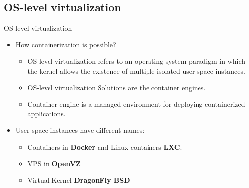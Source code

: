 \subsection{OS-level virtualization}\label{subsec:os-level-virtualization}
\begin{frame}{OS-level virtualization}
    \begin{itemize}
        \item How containerization is possible?
        \begin{itemize}
            \item OS-level virtualization refers to an operating system paradigm in which the kernel allows the existence of multiple isolated user space instances.
            \item OS-level virtualization Solutions are the container engines.
            \item Container engine is a managed environment for deploying containerized applications.
        \end{itemize}
        \item User space instances have different names:
        \begin{itemize}
            \item Containers in \textbf{Docker} and Linux containers \textbf{LXC}.
            \item VPS in \textbf{OpenVZ}
            \item Virtual Kernel \textbf{DragonFly BSD}
        \end{itemize}
    \end{itemize}
\end{frame}
